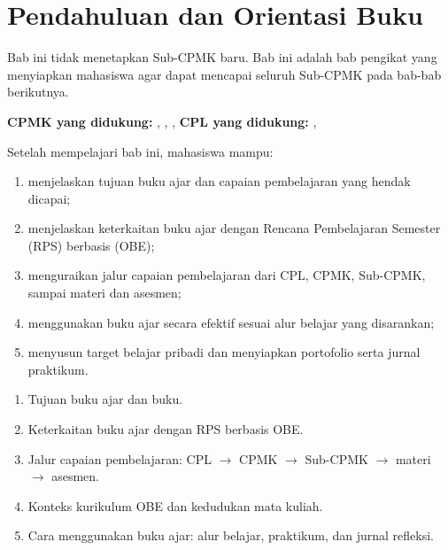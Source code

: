 \documentclass[../../main.tex]{subfiles}
\begin{document}
\chapter{Pendahuluan dan Orientasi Buku}
\label{chap:pendahuluan}


\begin{subcpmkbox}
Bab ini tidak menetapkan Sub-CPMK baru. Bab ini adalah bab
pengikat yang menyiapkan mahasiswa agar dapat mencapai seluruh
Sub-CPMK pada bab-bab berikutnya.

\vspace{0.4em}
\textbf{CPMK yang didukung:} , , ,
 \quad\textbullet\quad
\textbf{CPL yang didukung:} , 
\end{subcpmkbox}

\begin{tujuanbox}
Setelah mempelajari bab ini, mahasiswa mampu:
\begin{enumerate}
    \item menjelaskan tujuan buku ajar dan capaian pembelajaran yang
          hendak dicapai;
    \item menjelaskan keterkaitan buku ajar dengan Rencana
          Pembelajaran Semester (RPS) berbasis  (OBE);
    \item menguraikan jalur capaian pembelajaran dari CPL, CPMK,
          Sub-CPMK, sampai materi dan asesmen;
    \item menggunakan buku ajar secara efektif sesuai alur belajar
          yang disarankan;
    \item menyusun target belajar pribadi dan menyiapkan portofolio
          serta jurnal praktikum.
\end{enumerate}
\end{tujuanbox}

\begin{materibox}
\begin{enumerate}
    \item Tujuan buku ajar dan  buku.
    \item Keterkaitan buku ajar dengan RPS berbasis OBE.
    \item Jalur capaian pembelajaran: CPL $\rightarrow$ CPMK
          $\rightarrow$ Sub-CPMK $\rightarrow$ materi $\rightarrow$
          asesmen.
    \item Konteks kurikulum OBE dan kedudukan mata kuliah.
    \item Cara menggunakan buku ajar: alur belajar, praktikum, dan
          jurnal refleksi.
\end{enumerate}
\end{materibox}










\end{document}
